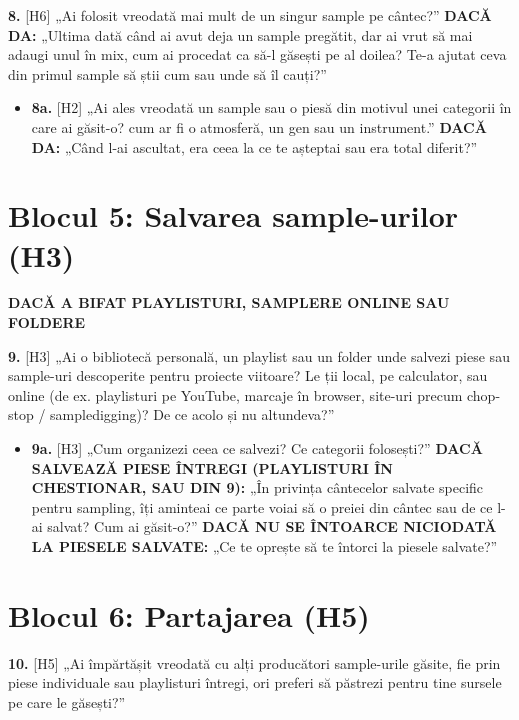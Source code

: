 \documentclass[12pt,a4paper]{report}
\newcommand{\cond}[1]{\textcolor{condition}{\textbf{#1}}}
\begin{document}
\begin{otherlanguage}{romanian}
\textbf{8.} [H6] „Ai folosit vreodată mai mult de un singur sample pe cântec?” \cond{DACĂ DA:} „Ultima dată când ai avut deja un sample pregătit, dar ai vrut să mai adaugi unul în mix, cum ai procedat ca să-l găsești pe al doilea? Te-a ajutat ceva din primul sample să știi cum sau unde să îl cauți?”

\begin{itemize}
  \item \textbf{8a.} [H2] „Ai ales vreodată un sample sau o piesă din motivul unei categorii în care ai găsit-o? cum ar fi o atmosferă, un gen sau un instrument.” \cond{DACĂ DA:} „Când l-ai ascultat, era ceea la ce te așteptai sau era total diferit?”
\end{itemize}

\section{Blocul 5: Salvarea sample-urilor (H3)}

\cond{DACĂ A BIFAT PLAYLISTURI, SAMPLERE ONLINE SAU FOLDERE}

\textbf{9.} [H3] „Ai o bibliotecă personală, un playlist sau un folder unde salvezi piese sau sample-uri descoperite pentru proiecte viitoare? Le ții local, pe calculator, sau online (de ex. playlisturi pe YouTube, marcaje în browser, site-uri precum chop-stop / sampledigging)? De ce acolo și nu altundeva?”

\begin{itemize}
  \item \textbf{9a.} [H3] „Cum organizezi ceea ce salvezi? Ce categorii folosești?” \cond{DACĂ SALVEAZĂ PIESE ÎNTREGI (PLAYLISTURI ÎN CHESTIONAR, SAU DIN 9):} „În privința cântecelor salvate specific pentru sampling, îți aminteai ce parte voiai să o preiei din cântec sau de ce l-ai salvat? Cum ai găsit-o?” \cond{DACĂ NU SE ÎNTOARCE NICIODATĂ LA PIESELE SALVATE:} „Ce te oprește să te întorci la piesele salvate?”
\end{itemize}

\section{Blocul 6: Partajarea (H5)}

\textbf{10.} [H5] „Ai împărtășit vreodată cu alți producători sample-urile găsite, fie prin piese individuale sau playlisturi întregi, ori preferi să păstrezi pentru tine sursele pe care le găsești?”


\end{otherlanguage}
\end{document}
